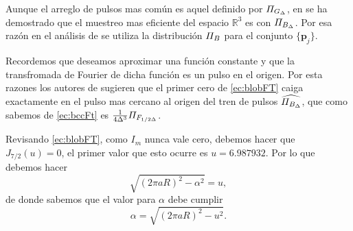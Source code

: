 Aunque el arreglo de pulsos mas común es aquel definido por $\varPi_{G_{\Delta}}$, en \cite{petersenSampling} se ha demostrado que el muestreo mas eficiente del espacio $\mathbb{R}^3$ es con $\varPi_{B_{\Delta}}$. Por esa razón en el análisis de \cite{LewitPractical} se utiliza la distribución $\varPi_{B}$ para el conjunto $\{ \textbf{p}_j \}$. 

Recordemos que deseamos aproximar una función constante y que la transfromada de Fourier de dicha función es un pulso en el origen. Por esta razones los autores de \cite{EdgarOptimization} sugieren que el primer cero de \eqref{ec:blobFT} caiga exactamente en el pulso mas cercano al origen del tren de pulsos $\widehat{\varPi_{B_\Delta}}$, que como sabemos de \eqref{ec:bccFt} es $\frac{1}{4 \Delta^3} \varPi_{F_{1 / 2 \Delta}}$.

Revisando \eqref{ec:blobFT}, como $I_m$ nunca vale cero, debemos hacer que $J_{7 / 2}(u) = 0$, el primer valor que esto ocurre es $u = 6.987932$. Por lo que debemos hacer
\begin{equation}
 \sqrt{(2 \pi a R)^2 - \alpha^2} = u,
\label{ec:alphaEcuation}
\end{equation}
de donde sabemos que el valor para $\alpha$ debe cumplir
\begin{equation}
 \alpha = \sqrt{(2 \pi a R)^2 - u^2}.
 \label{ec:alphaEcuationSolved}
\end{equation}


% 
% 
% 

